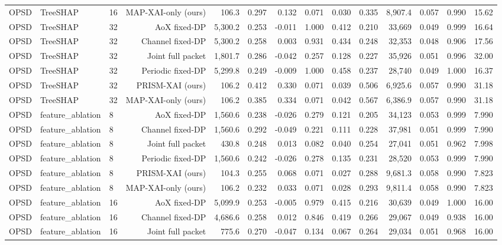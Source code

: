 \begin{longtable}{lllrrrrrrrrrrr}
OPSD & TreeSHAP & 16 & MAP-XAI-only (ours) & 106.3 & 0.297 & 0.132 & 0.071 & 0.030 & 0.335 & 8,907.4 & 0.057 & 0.990 & 15.62 \\
OPSD & TreeSHAP & 32 & AoX fixed-DP & 5,300.2 & 0.253 & -0.011 & 1.000 & 0.412 & 0.210 & 33,669 & 0.049 & 0.999 & 16.64 \\
OPSD & TreeSHAP & 32 & Channel fixed-DP & 5,300.2 & 0.258 & 0.003 & 0.931 & 0.434 & 0.248 & 32,353 & 0.048 & 0.906 & 17.56 \\
OPSD & TreeSHAP & 32 & Joint full packet & 1,801.7 & 0.286 & -0.042 & 0.257 & 0.128 & 0.227 & 35,926 & 0.051 & 0.996 & 32.00 \\
OPSD & TreeSHAP & 32 & Periodic fixed-DP & 5,299.8 & 0.249 & -0.009 & 1.000 & 0.458 & 0.237 & 28,740 & 0.049 & 1.000 & 16.37 \\
OPSD & TreeSHAP & 32 & PRISM-XAI (ours) & 106.2 & 0.412 & 0.330 & 0.071 & 0.039 & 0.506 & 6,925.6 & 0.057 & 0.990 & 31.18 \\
OPSD & TreeSHAP & 32 & MAP-XAI-only (ours) & 106.2 & 0.385 & 0.334 & 0.071 & 0.042 & 0.567 & 6,386.9 & 0.057 & 0.990 & 31.18 \\
OPSD & feature\_ablation & 8 & AoX fixed-DP & 1,560.6 & 0.238 & -0.026 & 0.279 & 0.121 & 0.205 & 34,123 & 0.053 & 0.999 & 7.990 \\
OPSD & feature\_ablation & 8 & Channel fixed-DP & 1,560.6 & 0.292 & -0.049 & 0.221 & 0.111 & 0.228 & 37,981 & 0.051 & 0.999 & 7.990 \\
OPSD & feature\_ablation & 8 & Joint full packet & 430.8 & 0.248 & 0.013 & 0.082 & 0.040 & 0.254 & 27,041 & 0.051 & 0.962 & 7.998 \\
OPSD & feature\_ablation & 8 & Periodic fixed-DP & 1,560.6 & 0.242 & -0.026 & 0.278 & 0.135 & 0.231 & 28,520 & 0.053 & 0.999 & 7.990 \\
OPSD & feature\_ablation & 8 & PRISM-XAI (ours) & 104.3 & 0.255 & 0.068 & 0.071 & 0.027 & 0.288 & 9,681.3 & 0.058 & 0.990 & 7.823 \\
OPSD & feature\_ablation & 8 & MAP-XAI-only (ours) & 106.2 & 0.232 & 0.033 & 0.071 & 0.028 & 0.293 & 9,811.4 & 0.058 & 0.990 & 7.823 \\
OPSD & feature\_ablation & 16 & AoX fixed-DP & 5,099.9 & 0.253 & -0.005 & 0.979 & 0.415 & 0.216 & 30,639 & 0.049 & 1.000 & 16.00 \\
OPSD & feature\_ablation & 16 & Channel fixed-DP & 4,686.6 & 0.258 & 0.012 & 0.846 & 0.419 & 0.266 & 29,067 & 0.049 & 0.938 & 16.00 \\
OPSD & feature\_ablation & 16 & Joint full packet & 775.6 & 0.270 & -0.047 & 0.134 & 0.067 & 0.264 & 29,034 & 0.051 & 0.968 & 16.00 \\

\end{longtable}
